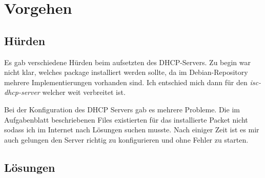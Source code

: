 \documentclass[12pt,a4paper,twoside,titlepage]{article}
\begin{document}
        \section{Vorgehen}

        \subsection{Hürden}

        Es gab verschiedene Hürden beim aufsetzten des DHCP-Servers. Zu begin war nicht klar, welches package installiert werden sollte, da im Debian-Repository mehrere Implementierungen vorhanden sind. Ich entschied mich dann für den \textit{isc-dhcp-server} welcher weit verbreitet ist.
        
        Bei der Konfiguration des DHCP Servers gab es mehrere Probleme. Die im Aufgabenblatt beschriebenen Files existierten für das installierte Packet nicht sodass ich im Internet nach Lösungen suchen musste. Nach einiger Zeit ist es mir auch gelungen den Server richtig zu konfigurieren und ohne Fehler zu starten.
        \subsection{Lösungen}
        
\end{document}
